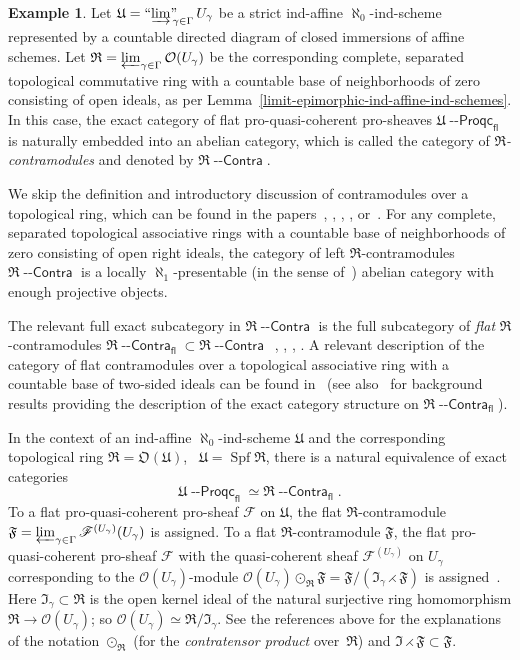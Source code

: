 \documentclass[12pt,a4paper]{amsart}
\newcommand{\+}{\protect\nobreakdash-}
\renewcommand{\:}{\colon}
\newcommand{\rarrow}{\longrightarrow}
\newcommand{\ocn}{\odot}
\newcommand{\tim}{\rightthreetimes}
\DeclareMathOperator{\Spf}{Spf}
\newcommand{\Contra}{{\operatorname{\mathsf{--Contra}}}}
\newcommand{\Proqc}{{\operatorname{\mathsf{--Proqc}}}}
\newcommand{\fl}{\mathsf{fl}}
\newcommand{\ilim}
 {\mathop{\text{\normalfont``$\varinjlim$''\!\!}}\nolimits}
\newcommand{\cO}{\mathcal O}
\newcommand{\fR}{\mathfrak R}
\newcommand{\fU}{\mathfrak U}
\newcommand{\fI}{\mathfrak I}
\newcommand{\fO}{\mathfrak O}
\newcommand{\fF}{\mathfrak F}
\newcommand{\rF}{\mathscr F}
\theoremstyle{plain}
\theoremstyle{definition}
\newtheorem{ex}[thm]{Example}
\begin{document}
\begin{ex} \label{ind-affine-ind-schemes-and-flat-contramodules}
 Let $\fU=\ilim_{\gamma\in\Gamma}U_\gamma$ be a strict ind-affine
$\aleph_0$\+ind-scheme represented by a countable directed diagram
of closed immersions of affine schemes.
 Let $\fR=\varprojlim_{\gamma\in\Gamma}\cO(U_\gamma)$ be
the corresponding complete, separated topological commutative ring
with a countable base of neighborhoods of zero consisting of open
ideals, as per Lemma~\ref{limit-epimorphic-ind-affine-ind-schemes}.
 In this case, the exact category of flat pro-quasi-coherent
pro-sheaves $\fU\Proqc_\fl$ is naturally embedded into an abelian
category, which is called the category of \emph{$\fR$\+contramodules}
and denoted by $\fR\Contra$.

 We skip the definition and introductory discussion of contramodules
over a topological ring, which can be found in
the papers~\cite[Sections~1.1\+-1.2 and~5]{PR},
\cite[Sections~6\+-7]{PS1}, \cite[Section~2]{Pproperf},
\cite[Section~7]{Pflcc}, or~\cite[Section~3]{Pbc}.
 For any complete, separated topological associative rings with
a countable base of neighborhoods of zero consisting of open right
ideals, the category of left $\fR$\+contramodules $\fR\Contra$ is
a locally $\aleph_1$\+presentable (in the sense
of~\cite[Definition~1.17 and Theorem~1.20]{AR}) abelian category
with enough projective objects.

 The relevant full exact subcategory in $\fR\Contra$ is the full
subcategory of \emph{flat} $\fR$\+contramodules $\fR\Contra_\fl
\subset\fR\Contra$ \,\cite[Section~E.1]{Pcosh},
\cite[Sections~6\+-7]{PR}, \cite[Section~3]{Pproperf},
\cite[Section~8]{Pflcc}.
 A relevant description of the category of flat contramodules over
a topological associative ring with a countable base of two-sided
ideals can be found in~\cite[Lemma~8.6(b)]{Pflcc} (see
also~\cite[Lemma~8.4]{Pflcc} for background results providing
the description of the exact category structure on $\fR\Contra_\fl$).

 In the context of an ind-affine $\aleph_0$\+ind-scheme $\fU$ and
the corresponding topological ring $\fR=\fO(\fU)$, \ $\fU=\Spf\fR$,
there is a natural equivalence of exact categories
$$
 \fU\Proqc_\fl\simeq\fR\Contra_\fl.
$$
 To a flat pro-quasi-coherent pro-sheaf $\rF$ on $\fU$,
the flat $\fR$\+contramodule $\fF=\varprojlim_{\gamma\in\Gamma}
\rF^{(U_\gamma)}(U_\gamma)$ is assigned.
 To a flat $\fR$\+contramodule $\fF$, the flat pro-quasi-coherent
pro-sheaf $\rF$ with the quasi-coherent sheaf $\rF^{(U_\gamma)}$
on $U_\gamma$ corresponding to the $\cO(U_\gamma)$\+module
$\cO(U_\gamma)\ocn_\fR\fF=\fF/(\fI_\gamma\tim\fF)$ is
assigned~\cite[Examples~3.8(1\+-2)]{Psemten}.
 Here $\fI_\gamma\subset\fR$ is the open kernel ideal of the natural
surjective ring homomorphism $\fR\rarrow\cO(U_\gamma)$; so
$\cO(U_\gamma)\simeq\fR/\fI_\gamma$.
 See the references above for the explanations of the notation
$\ocn_\fR$ (for the \emph{contratensor product} over~$\fR$)
and $\fI\tim\fF\subset\fF$.


\end{ex}
\end{document}
